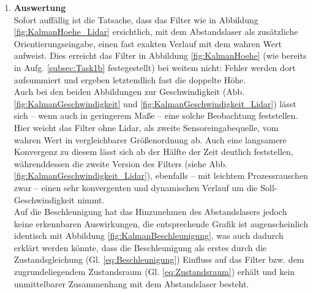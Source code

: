 \documentclass[12pt,a4paper]{article}
\begin{document}
\begin{enumerate}[label=\textbf{\arabic*})]
\begin{enumerate}[label=\textbf{\alph*})]
		\item \textbf{Auswertung}\label{subsec:Auswertung}\\
		
		Sofort auffällig ist die Tatsache, dass das Filter wie in Abbildung \ref{fig:KalmanHoehe_Lidar} ersichtlich, mit dem Abstandslaser als zusätzliche Orientierungseingabe, einen fast exakten Verlauf mit dem wahren Wert aufweist. Dies erreicht das Filter in Abbildung \ref{fig:KalmanHoehe} (wie bereits in Aufg. \ref{subsec:Task1b} festegestellt) bei weitem nicht: Fehler werden dort aufsummiert und ergeben letztendlich fast die doppelte Höhe.\\
		
		Auch bei den beiden Abbildungen zur Geschwindigkeit (Abb. \ref{fig:KalmanGeschwindigkeit} und \ref{fig:KalmanGeschwindigkeit_Lidar}) lässt sich -- wenn auch in geringerem Maße -- eine solche Beobachtung feststellen. Hier weicht das Filter ohne Lidar, als zweite Sensoreingabequelle, vom wahren Wert in vergleichbarer Größenordnung ab. Auch eine langsamere Konvergenz zu diesem lässt sich ab der Hälfte der Zeit deutlich feststellen, währenddessen die zweite Version des Filters (siehe Abb. \ref{fig:KalmanGeschwindigkeit_Lidar}), ebenfalls -- mit leichtem Prozessrauschen zwar -- einen sehr konvergenten und dynamischen Verlauf um die Soll-Geschwindigkeit nimmt.\\
		
		Auf die Beschleunigung hat das Hinzunehmen des Abstandslasers jedoch keine erkennbaren Auswirkungen, die entsprechende Grafik ist augenscheinlich identisch mit Abbildung \ref{fig:KalmanBeschleunigung}, was auch dadurch erklärt werden könnte, dass die Beschleunigung als erstes durch die Zustandsgleichung (Gl. \ref{eq:Beschleunigung}) Einfluss auf das Filter bzw. dem zugrundeliegendem Zustandsraum (Gl. \ref{eq:Zustandsraum}) erhält und kein unmittelbarer Zusammenhang mit dem Abstandslaser besteht.\\
		

\end{enumerate}
\end{enumerate}
\end{document}

